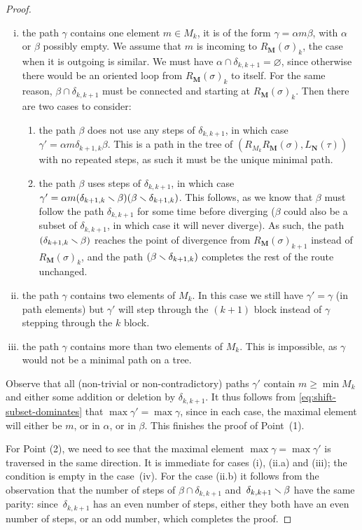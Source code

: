 \begin{proof}
\begin{enumerate}[i)]
\item the path $\gamma$ contains one element $m\in M_k$, \ie it is of the form $\gamma = \alpha m \beta$, with $\alpha$ or $\beta$ possibly empty.
We assume that $m$ is incoming to $R_\mathbf{M}(\sigma)_{k}$, the case when it is outgoing is similar.
We must have $\alpha \cap \delta_{k,k+1}=\varnothing$, since otherwise there would be an oriented loop from $R_\mathbf{M}(\sigma)_{k}$ to itself.
For the same reason, $\beta \cap \delta_{k,k+1}$ must be connected and starting at $R_\mathbf{M}(\sigma)_{k}$.
Then there are two cases to consider:
	\begin{enumerate}
	\item the path $\beta$ does not use any steps of $\delta_{k,k+1}$, in which case $\gamma' = \alpha m \delta_{k+1,k} \beta$.
	This is a path in the tree of $(R_{M_k}R_{\mathbf{M}}(\sigma),L_{\mathbf{N}}(\tau))$ with no repeated steps, as such it must be the unique minimal path. 

	\item the path $\beta$ uses steps of $\delta_{k,k+1}$, in which case $\gamma' = \alpha m (\delta_{k+1,k}\smallsetminus \beta)(\beta \smallsetminus \delta_{k+1,k})$.
	This follows, as we know that $\beta$ must follow the path $\delta_{k,k+1}$ for some time before diverging ($\beta$ could also be a subset of $\delta_{k,k+1}$, in which case it will never diverge).
	As such, the path $(\delta_{k+1,k}\smallsetminus \beta)$ reaches the point of divergence from $R_{\mathbf{M}}(\sigma)_{k+1}$ instead of $R_{\mathbf{M}}(\sigma)_{k}$, and the path $(\beta \smallsetminus \delta_{k+1,k})$ completes the rest of the route unchanged.
	\end{enumerate}

\item the path $\gamma$ contains two elements of $M_k$. 
In this case we still have $\gamma'=\gamma$ (in path elements) but $\gamma'$ will step through the $(k+1)$\ordinalst{} block instead of $\gamma$ stepping through the $k$\ordinal{} block.

\item the path $\gamma$ contains more than two elements of $M_k$. 
This is impossible, as $\gamma$ would not be a minimal path on a tree.

\end{enumerate}
Observe that all (non-trivial or non-contradictory) paths $\gamma'$ contain $m \geq \min M_k$ and either some addition or deletion by $\delta_{k,k+1}$.
It thus follows from \cref{eq:shift-subset-dominates} that $\max \gamma' = \max \gamma$, since in each case, the maximal element will either be $m$, or in $\alpha$, or in $\beta$.
This finishes the proof of Point~(1).

For Point (2), we need to see that the maximal element $\max \gamma = \max \gamma'$ is traversed in the same direction.
It is immediate for cases (i), (ii.a) and (iii); the condition is empty in the case~(iv).
For the case (ii.b) it follows from the observation that the number of steps of $\beta \cap \delta_{k,k+1}$ and~$\delta_{k,k+1} \smallsetminus \beta$ have the same parity: since~$\delta_{k,k+1}$ has an even number of steps, either they both have an even number of steps, or an odd number, which completes the proof.
\end{proof}

